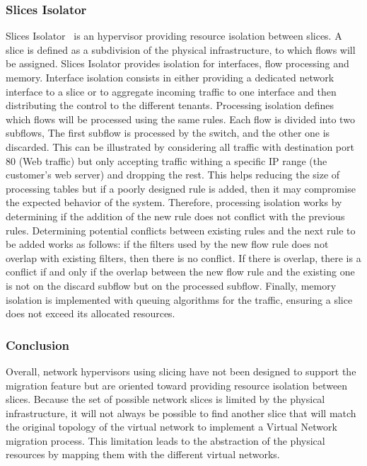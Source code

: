 \subsubsection{Slices Isolator}
Slices Isolator~\cite{SlicesIsolator-El-Azzab2011} is an hypervisor providing resource isolation between slices. A slice is defined as a subdivision of the physical infrastructure, to which flows will be assigned. Slices Isolator provides isolation for interfaces, flow processing and memory. Interface isolation consists in either providing a dedicated network interface to a slice or to aggregate incoming traffic to one interface and then distributing the control to the different tenants. Processing isolation defines which flows will be processed using the same rules.
Each flow is divided into two subflows,  The first subflow is processed by the switch, and the other one is discarded. This can be illustrated by considering all traffic with destination port 80 (Web traffic) but only accepting traffic withing a specific IP range (the customer's web server) and dropping the rest. This helps reducing the size of processing tables but if a poorly designed rule is added, then it may compromise the expected behavior of the system. Therefore, processing isolation works by determining if the addition of the new rule does not conflict with the previous rules. Determining potential conflicts between existing rules and the next rule to be added works as follows: if the filters used by the new flow rule does not overlap with existing filters, then there is no conflict.
If there is overlap, there is a conflict if and only if the overlap between the new flow rule and the existing one is not on the discard subflow but on the processed subflow. Finally, memory isolation is implemented with queuing algorithms for the traffic, ensuring a slice does not exceed its allocated resources. 

\subsubsection{Conclusion} 
Overall, network hypervisors using slicing have not been designed to support the migration feature but are oriented toward providing resource isolation between slices. Because the set of possible network slices is limited by the physical infrastructure, it will not always be possible to find another slice that will match the original topology of the virtual network to implement a Virtual Network migration process. This limitation leads to the abstraction of the physical resources by mapping them with the different virtual networks.

